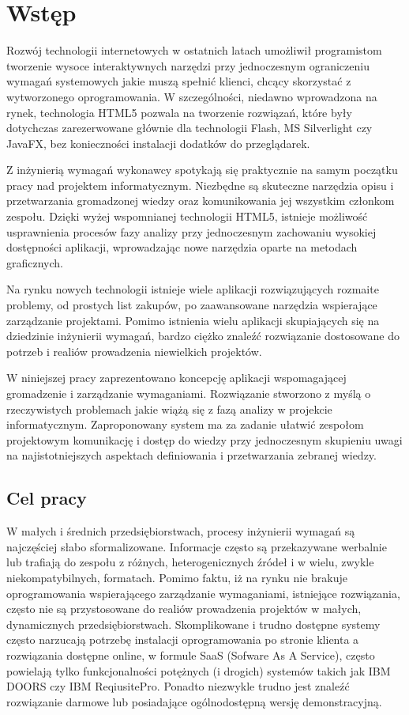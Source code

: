 \chapter{Wstęp}

    Rozwój technologii internetowych w ostatnich latach umożliwił programistom tworzenie wysoce interaktywnych narzędzi przy jednoczesnym ograniczeniu wymagań systemowych jakie muszą spełnić klienci, chcący skorzystać z wytworzonego oprogramowania. W szczególności, niedawno wprowadzona na rynek, technologia HTML5 pozwala na tworzenie rozwiązań, które były dotychczas zarezerwowane głównie dla technologii Flash, MS Silverlight czy JavaFX, bez konieczności instalacji dodatków do przeglądarek.

    Z inżynierią wymagań wykonawcy spotykają się praktycznie na samym początku pracy nad projektem informatycznym. Niezbędne są skuteczne narzędzia opisu i przetwarzania gromadzonej wiedzy oraz komunikowania jej wszystkim członkom zespołu. Dzięki wyżej wspomnianej technologii HTML5, istnieje możliwość usprawnienia procesów fazy analizy przy jednoczesnym zachowaniu wysokiej dostępności aplikacji, wprowadzając nowe narzędzia oparte na metodach graficznych. 

    Na rynku nowych technologii istnieje wiele aplikacji rozwiązujących rozmaite problemy, od prostych list zakupów, po zaawansowane narzędzia wspierające zarządzanie projektami. Pomimo istnienia wielu aplikacji skupiających się na dziedzinie inżynierii wymagań, bardzo ciężko znaleźć rozwiązanie dostosowane do potrzeb i realiów prowadzenia niewielkich projektów. 
          
    W niniejszej pracy zaprezentowano koncepcję aplikacji wspomagającej gromadzenie i zarządzanie wymaganiami. Rozwiązanie stworzono z myślą o rzeczywistych problemach jakie wiążą się z fazą analizy w projekcie informatycznym. Zaproponowany system ma za zadanie ułatwić zespołom projektowym komunikację i dostęp do wiedzy przy jednoczesnym skupieniu uwagi na najistotniejszych aspektach definiowania i przetwarzania zebranej wiedzy.


    \section{Cel pracy}

      W małych i średnich przedsiębiorstwach, procesy inżynierii wymagań są najczęściej słabo sformalizowane. Informacje często są przekazywane werbalnie lub trafiają do zespołu z różnych, heterogenicznych źródeł i w wielu, zwykle niekompatybilnych, formatach. Pomimo faktu, iż na rynku nie brakuje oprogramowania wspierającego zarządzanie wymaganiami, istniejące rozwiązania, często nie są przystosowane do realiów prowadzenia projektów w małych, dynamicznych przedsiębiorstwach. Skomplikowane i trudno dostępne systemy często narzucają potrzebę instalacji oprogramowania po stronie klienta a rozwiązania dostępne online, w formule SaaS (Sofware As A Service), często powielają tylko funkcjonalności potężnych (i drogich) systemów takich jak IBM DOORS czy IBM ReqiusitePro. Ponadto niezwykle trudno jest znaleźć rozwiązanie darmowe lub posiadające ogólnodostępną wersję demonstracyjną. 

